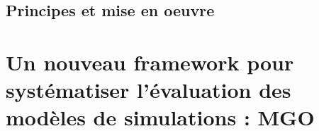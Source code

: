 \subsection{Principes et mise en oeuvre}

\section{Un nouveau framework pour systématiser l'évaluation des modèles de simulations : MGO}
\label{sec:MGO}







